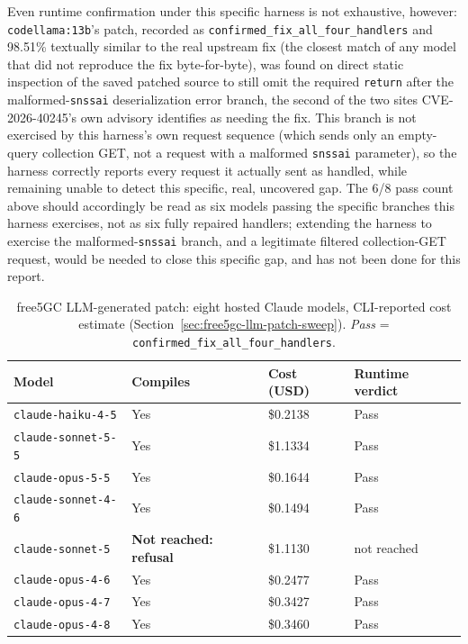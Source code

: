 \documentclass[12pt,a4paper]{report}
\begin{document}
Even runtime confirmation under this specific harness is not exhaustive, however: \texttt{codellama:13b}'s patch, recorded as \texttt{confirmed\_fix\_all\_four\_handlers} and 98.51\% textually similar to the real upstream fix (the closest match of any model that did not reproduce the fix byte-for-byte), was found on direct static inspection of the saved patched source to still omit the required \texttt{return} after the malformed-\texttt{snssai} deserialization error branch, the second of the two sites CVE-2026-40245's own advisory identifies as needing the fix. This branch is not exercised by this harness's own request sequence (which sends only an empty-query collection GET, not a request with a malformed \texttt{snssai} parameter), so the harness correctly reports every request it actually sent as handled, while remaining unable to detect this specific, real, uncovered gap. The 6/8 pass count above should accordingly be read as six models passing the specific branches this harness exercises, not as six fully repaired handlers; extending the harness to exercise the malformed-\texttt{snssai} branch, and a legitimate filtered collection-GET request, would be needed to close this specific gap, and has not been done for this report.

\begin{table}[H]
\centering
\caption{free5GC LLM-generated patch: eight hosted Claude models, CLI-reported cost estimate (Section~\ref{sec:free5gc-llm-patch-sweep}). \textit{Pass} = \texttt{confirmed\_fix\_all\_four\_handlers}.}
\small
\begin{tabular}{@{}p{3.6cm}p{2.4cm}p{2.0cm}p{2.6cm}@{}}
\toprule
\textbf{Model} & \textbf{Compiles} & \textbf{Cost (USD)} & \textbf{Runtime verdict} \\
\midrule
\texttt{claude-haiku-4-5} & Yes & \$0.2138 & Pass \\
\texttt{claude-sonnet-5-5} & Yes & \$1.1334 & Pass \\
\texttt{claude-opus-5-5} & Yes & \$0.1644 & Pass \\
\texttt{claude-sonnet-4-6} & Yes & \$0.1494 & Pass \\
\texttt{claude-sonnet-5} & \textbf{Not reached: refusal} & \$1.1130 & not reached \\
\texttt{claude-opus-4-6} & Yes & \$0.2477 & Pass \\
\texttt{claude-opus-4-7} & Yes & \$0.3427 & Pass \\
\texttt{claude-opus-4-8} & Yes & \$0.3460 & Pass \\
\bottomrule
\end{tabular}
\end{table}
\end{document}
